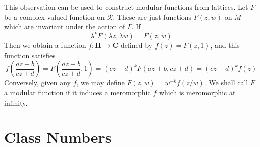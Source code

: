 This observation can be used to construct modular functions from lattices. Let $F$ be a complex valued function on $\mathcal{R}$. These are just functions $F(z,w)$ on $M$ which are invariant under the action of $\Gamma$. If
%
\[ \lambda^k F(\lambda z, \lambda w) = F(z,w) \]
%
Then we obtain a function $f: \mathbf{H} \to \mathbf{C}$ defined by $f(z) = F(z,1)$, and this function satisfies
%
\[ f \left( \frac{az + b}{cz + d} \right) = F \left( \frac{az + b}{cz + d}, 1 \right) = (cz + d)^{k} F(az + b, cz + d) = (cz + d)^{k} f(z) \]
%
Conversely, given any $f$, we may define $F(z,w) = w^{-k} f(z/w)$. We shall call $F$ a modular function if it induces a meromorphic $f$ which is meromorphic at infinity.

\section{Class Numbers}

